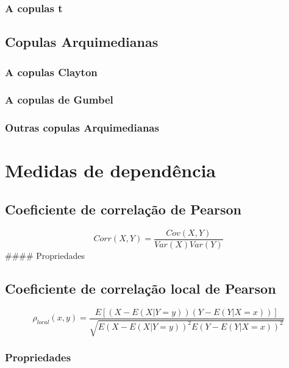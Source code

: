 \documentclass[
	12pt,				%
	oneside,			%
	a4paper,			%
	chapter=TITLE,		%
	section=TITLE,		%
	english,			%
	brazil				%
	]{abntex2}
\begin{document}
\subsubsection{A copulas t}\label{a-copulas-t}

\subsection{Copulas Arquimedianas}\label{copulas-arquimedianas}

\subsubsection{A copulas Clayton}\label{a-copulas-clayton}

\subsubsection{A copulas de Gumbel}\label{a-copulas-de-gumbel}

\subsubsection{Outras copulas
Arquimedianas}\label{outras-copulas-arquimedianas}

\section{Medidas de dependência}\label{medidas-de-dependuxeancia}

\subsection{Coeficiente de correlação de
Pearson}\label{coeficiente-de-correlauxe7uxe3o-de-pearson}

\[Corr(X, Y ) = \frac{Cov(X, Y )}{Var(X)Var(Y)}\] \#\#\#\# Propriedades

\subsection{Coeficiente de correlação local de
Pearson}\label{coeficiente-de-correlauxe7uxe3o-local-de-pearson}

\[\rho_{local}(x, y) = \frac{E[(X - E(X|Y = y))(Y - E(Y|X = x))]}{\sqrt{E(X - E(X|Y = y))^2 E(Y - E(Y |X = x))^2}}\]

\subsubsection{Propriedades}\label{propriedades}
\end{document}
